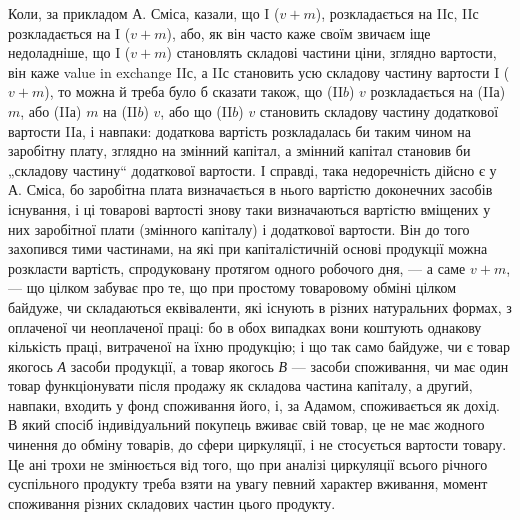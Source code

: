 Коли, за прикладом А. Сміса, казали, що I ($v + m$), розкладається на
II$с$, II$с$ розкладається на I ($v + m$), або, як він часто каже своїм
звичаєм іще недоладніше, що I ($v + m$) становлять складові частини ціни,
зглядно вартости, він каже value in exchange II$с$, а II$с$ становить усю
складову частину вартости I ($v + m$), то можна й треба було б сказати
також, що (II$b$) $v$ розкладається на (II$а$) $m$, або (II$а$) $m$ на (II$b$) $v$,
або що (II$b$) $v$ становить складову частину додаткової вартости II$а$, і
навпаки: додаткова вартість розкладалась би таким чином на заробітну
плату, зглядно на змінний капітал, а змінний капітал становив би „складову
частину“ додаткової вартости. І справді, така недоречність дійсно
є у А. Сміса, бо заробітна плата визначається в нього вартістю доконечних
засобів існування, і ці товарові вартості знову таки визначаються
вартістю вміщених у них заробітної плати (змінного капіталу) і додаткової
вартости. Він до того захопився тими частинами, на які при капіталістичній
основі продукції можна розкласти вартість, спродуковану протягом
одного робочого дня, — а саме $v + m$, — що цілком забуває про те, що при
простому товаровому обміні цілком байдуже, чи складаються еквіваленти,
які існують в різних натуральних формах, з оплаченої чи неоплаченої праці:
бо в обох випадках вони коштують однакову кількість праці, витраченої
на їхню продукцію; і що так само байдуже, чи є товар якогось \emph{А} засоби
продукції, а товар якогось \emph{В} — засоби споживання, чи має один
товар функціонувати після продажу як складова частина капіталу, а
другий, навпаки, входить у фонд споживання його, і, за Адамом, споживається
як дохід. В який спосіб індивідуальний покупець вживає свій
товар, це не має жодного чинення до обміну товарів, до сфери циркуляції,
і не стосується вартости товару. Це ані трохи не змінюється
від того, що при аналізі циркуляції всього річного суспільного продукту
треба взяти на увагу певний характер вживання, момент споживання
різних складових частин цього продукту.


